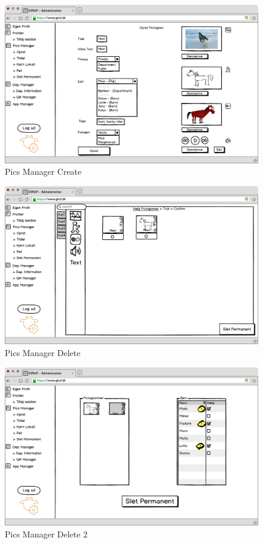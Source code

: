 \begin{figure}[!h]
\centering
\includegraphics[width=1\textwidth]{images/mockup/picsManagerOpret.png}
\caption{Pics Manager Create}
\label{fig:pics_manager_create}
\end{figure}

\newpage

\begin{figure}[!h]
\centering
\includegraphics[width=1\textwidth]{images/mockup/picsManagerSlet.png}
\caption{Pics Manager Delete}
\label{fig:pics_manager_delete}
\end{figure}

\begin{figure}[!h]
\centering
\includegraphics[width=1\textwidth]{images/mockup/picsManagerSlet2.png}
\caption{Pics Manager Delete 2}
\label{fig:pics_manager_delete2}
\end{figure}


